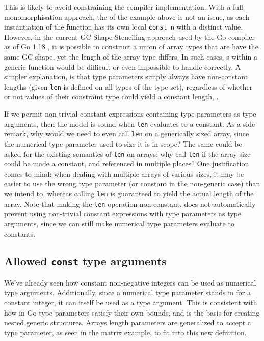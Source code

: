 
This is likely to avoid constraining the compiler implementation. With a full
monomorphisation approach, the  of the example above is not an issue,
as each instantiation of the function has its own local \texttt{const n} with a
distinct value. However, in the current GC Shape Stenciling approach used by the
Go compiler as of Go 1.18 \autocite{generics1.18}, it is possible to construct a
union of array types that are have the same GC shape, yet the length of the
array type differs. In such cases, s within a generic function would
be difficult or even impossible to handle correctly. A simpler explanation, is
that type parameters simply always have non-constant lengths (given \texttt{len}
is defined on all types of the type set), regardless of whether or not values
of their constraint type could yield a constant length, \autocite{spec}.

If we permit non-trivial constant expressions containing type parameters as type
arguments, then the model is sound when \texttt{len} evaluates to a constant. As
a side remark, why would we need to even call \texttt{len} on a generically
sized array, since the numerical type parameter used to size it is in scope? The
same could be asked for the existing semantics of \texttt{len} on arrays: why
call \texttt{len} if the array size could be made a constant, and referenced in
multiple places? One justification comes to mind: when dealing with multiple
arrays of various sizes, it may be easier to use the wrong type parameter (or
constant in the non-generic case) than we intend to, whereas calling
\texttt{len} is guaranteed to yield the actual length of the array. Note that
making the \texttt{len} operation non-constant, does not automatically prevent
using non-trivial constant expressions with type parameters as type arguments,
since we can still make numerical type parameters evaluate to constants.



\subsection{Allowed \texttt{const} type arguments}

We've already seen how constant non-negative integers can be used as numerical
type arguments. Additionally, since a numerical type parameter stands in for a
constant integer, it can itself be used as a type argument. This is consistent
with how in Go type parameters satisfy their own bounds, and is the basis for
creating nested generic structures. Arrays length parameters are generalized to
accept a  type parameter, as seen in the matrix example, to fit into
this new definition.

